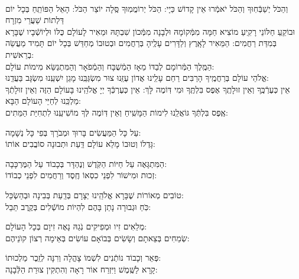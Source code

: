 \documentclass[twoside, openany, parskip=half, 11pt]{book}
\begin{document}
\\
\shatz {}
 וְהַכֹּל יְשַׁבְּֿחֽוּךָ וְהַכֹּל יֹאמְֿרוּ אֵין קָדוֹשׁ כַּיָי:\hfill \break
 \kahal הַכֹּל יְרוֹמֲמֽוּךָ סֶּֽלָה יוֹצֵר הַכֹּל: הָאֵל הַפּוֹתֵֽחַ בְּכָל יוֹם דַּלְתוֹת שַׁעֲרֵי מִזְרָח\\
 \shatz וּבוֹקֵֽעַ חַלּוֹנֵי רָקִֽיעַ מוֹצִיא חַמָּה מִמְּֿקוֹמָהּ וּלְבָנָה מִמְּֿכוֹן שִׁבְתָּהּ 
 \kahal וּמֵאִיר לָעוֹלָם כֻּלּוֹ וּלְיוֹשְֿׁבָיו שֶׁבָּרָא בְּמִדַּת רַחֲמִים: \hfill \break
 \shatz הַמֵּאִיר לָאָֽרֶץ וְלַדָּרִים עָלֶֽיהָ בְּרַחֲמִים וּבְטוּבוֹ מְחַדֵּשׁ בְּכָל יוֹם תָּמִיד מַעֲשֵׂה בְרֵאשִׁית: \\
 \kahal הַמֶּֽלֶךְ הַמְּֿרוֹמָם לְבַדּוֹ מֵאָז הַמְֿשֻׁבָּח וְהַמְֿפֹאָר וְהַמִּתְנַשֵּׂא מִימוֹת עוֹלָם: \\
 \shatz אֱלֹהֵי עוֹלָם בְּרַחֲמֶֽיךָ הָרַבִּים רַחֵם עָלֵֽינוּ אֲדוֹן עֻזֵּֽנוּ צוּר מִשְׂגַּבֵּֽנוּ מָגֵן יִשְׁעֵֽנוּ מִשְׂגָּב בַּעֲדֵֽנוּ: \\
 \kahal אֵין כְּעֶרְֿכֶּֽךָ וְאֵין זוּלָתֶֽךָ אֶפֶס בִּלְתֶּֽךָ וּמִי דּֽוֹמֶה לָּךְ: \hfill \break
 \shatz אֵין כְּעֶרְכְּֿךָ יְיָ אֱלֹהֵֽינוּ בָּעוֹלָם הַזֶּה וְאֵין זוּלָתְֿךָ מַלְכֵּֽנוּ לְחַיֵּי הָעוֹלָם הַבָּא:\\
 \kahal אֶֽפֶס בִּלְתְּֿךָ גּוֹאֲלֵֽנוּ לִימוֹת הַמָּשִֽׁיחַ וְאֵין דּֽוֹמֶה לְּךָ מוֹשִׁיעֵֽנוּ לִתְחִיַּת הַמֵּתִים:

\shatz {}
 עַל כָּל הַמַּעֲשִׂים \hfill בָּרוּךְ וּמְבֹרָךְ בְּפִי כָּל נְשָׁמָה: \\
\kahal גָּדְלוֹ וְטוּבוֹ מָלֵא עוֹלָם \hfill דַּֽעַת וּתְבוּנָה סוֹבֲבִים אוֹתוֹ:

\shatz הַמִּתְגָּאֶה עַל חַיּוֹת הַקֹּֽדֶשׁ \hfill וְנֶהְדָּר בְּכָבוֹד עַל הַמֶּרְכָּבָה:\\
\kahal זְכוּת וּמִישׁוֹר לִפְנֵי כִסְאוֹ \hfill חֶֽסֶד וְרַחֲמִים לִפְנֵי כְבוֹדוֹ: 

\shatz טוֹבִים מְאוֹרוֹת שֶׁבָּרָא אֱלֹהֵֽינוּ \hfill 	יְצָרָם בְּדַֽעַת בְּבִינָה וּבְהַשְׂכֵּל:\\
\kahal כֹּֽחַ וּגְבוּרָה נָתַן בָּהֶם \hfill לִהְיוֹת מוֹשְֿׁלִים בְּקֶֽרֶב תֵּבֵל:

\shatz מְלֵאִים זִיו וּמְפִיקִים נֹֽגַהּ \hfill נָאֶה זִיוָם בְּכָל הָעוֹלָם: \\
\kahal שְׂמֵחִים בְּצֵאתָם וְשָׂשִׂים בְּבוֹאָם \hfill עוֹשִׂים בְּאֵימָה רְצוֹן קוׂנֵיהֶם:
 
\shatz פְּאֵר וְכָבוֹד נוֹתְֿנִים לִשְׁמוֹ \hfill צָהֳלָה וְרִנָּה לְזֵֽכֶר מַלְכוּתוֹ: \\
\kahal קָרָא לַשֶּֽׁמֶשׁ וַיִּזְרַח אוֹר \hfill רָאָה וְהִתְקִין צוּרַת הַלְּֿבָנָה:
\end{document}
